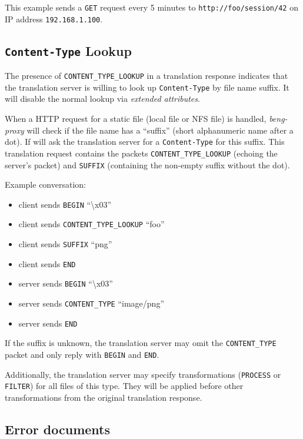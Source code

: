 \documentclass[a4paper,12pt]{article}
\begin{document}
This example sends a \verb|GET| request every 5 minutes to
\texttt{http://foo/session/42} on IP address \texttt{192.168.1.100}.

\subsection{\texttt{Content-Type} Lookup}
\label{ctlookup}

The presence of \verb|CONTENT_TYPE_LOOKUP| in a translation response
indicates that the translation server is willing to look up
\texttt{Content-Type} by file name suffix.  It will disable the normal
lookup via \textit{extended attributes}.

When a HTTP request for a static file (local file or NFS file) is
handled, \emph{beng-proxy} will check if the file name has a
``suffix'' (short alphanumeric name after a dot).  If will ask the
translation server for a \texttt{Content-Type} for this suffix.  This
translation request contains the packets \verb|CONTENT_TYPE_LOOKUP|
(echoing the server's packet) and \verb|SUFFIX| (containing the
non-empty suffix without the dot).

Example conversation:

\begin{itemize}
\item client sends \verb|BEGIN| ``\textbackslash{}x03''
\item client sends \verb|CONTENT_TYPE_LOOKUP| ``foo''
\item client sends \verb|SUFFIX| ``png''
\item client sends \verb|END|
\item server sends \verb|BEGIN| ``\textbackslash{}x03''
\item server sends \verb|CONTENT_TYPE| ``image/png''
\item server sends \verb|END|
\end{itemize}

If the suffix is unknown, the translation server may omit the
\verb|CONTENT_TYPE| packet and only reply with \verb|BEGIN| and
\verb|END|.

Additionally, the translation server may specify transformations
(\verb|PROCESS| or \verb|FILTER|) for all files of this type.  They
will be applied before other transformations from the original
translation response.

\subsection{Error documents}
\label{errdoc}
\end{document}
